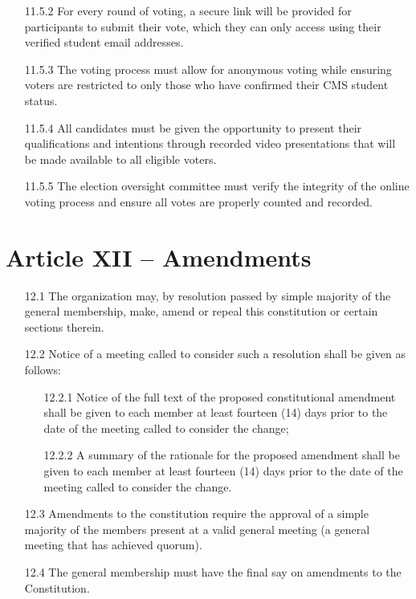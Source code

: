 \documentclass[12pt,a4paper]{article}
\begin{document}
\begin{enumerate}
\begin{enumerate}
\item[11.5.2] For every round of voting, a secure link will be provided for participants to submit their vote, which they can only access using their verified student email addresses.

\item[11.5.3] The voting process must allow for anonymous voting while ensuring voters are restricted to only those who have confirmed their CMS student status.

\item[11.5.4] All candidates must be given the opportunity to present their qualifications and intentions through recorded video presentations that will be made available to all eligible voters.

\item[11.5.5] The election oversight committee must verify the integrity of the online voting process and ensure all votes are properly counted and recorded.
\end{enumerate}
\end{enumerate}

\section*{Article XII – Amendments}

\begin{enumerate}
\item[12.1] The organization may, by resolution passed by simple majority of the general membership, make, amend or repeal this constitution or certain sections therein.

\item[12.2] Notice of a meeting called to consider such a resolution shall be given as follows:

\begin{enumerate}
\item[12.2.1] Notice of the full text of the proposed constitutional amendment shall be given to each member at least fourteen (14) days prior to the date of the meeting called to consider the change;

\item[12.2.2] A summary of the rationale for the proposed amendment shall be given to each member at least fourteen (14) days prior to the date of the meeting called to consider the change.
\end{enumerate}

\item[12.3] Amendments to the constitution require the approval of a simple majority of the members present at a valid general meeting (a general meeting that has achieved quorum).

\item[12.4] The general membership must have the final say on amendments to the Constitution.
\end{enumerate}
\end{document}
